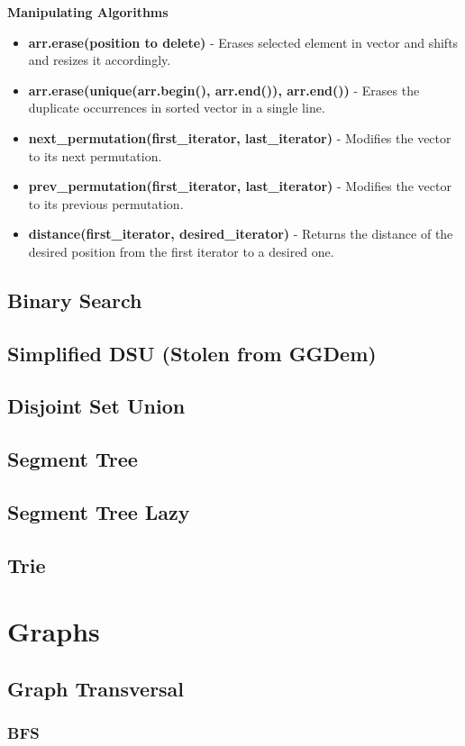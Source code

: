 \textbf{Manipulating Algorithms}
\begin{itemize}
\item \textbf{arr.erase(position to delete)} - Erases selected element in vector and shifts and resizes it accordingly.
\item \textbf{arr.erase(unique(arr.begin(), arr.end()), arr.end())} - Erases the duplicate occurrences in sorted vector in a single line.
\item \textbf{next\_permutation(first\_iterator, last\_iterator)} - Modifies the vector to its next permutation.
\item \textbf{prev\_permutation(first\_iterator, last\_iterator)} - Modifies the vector to its previous permutation.
\item \textbf{distance(first\_iterator, desired\_iterator)} - Returns the distance of the desired position from the first iterator to a desired one.
\end{itemize}
\subsection{Binary Search}
\subsection{Simplified DSU (Stolen from GGDem)}
\subsection{Disjoint Set Union}
\subsection{Segment Tree}
\subsection{Segment Tree Lazy}
\subsection{Trie}


\section{Graphs}
\subsection{Graph Transversal}
\subsubsection{BFS}
